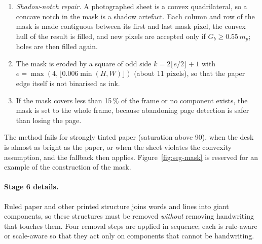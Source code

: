 \begin{enumerate}
\item \emph{Shadow-notch repair.} A photographed sheet is a convex quadrilateral, so a concave notch in the mask is a shadow artefact. Each column and row of the mask is made contiguous between its first and last mask pixel, the convex hull of the result is filled, and new pixels are accepted only if $G_b\ge0.55\,m_p$; holes are then filled again.
\item The mask is eroded by a square of odd side $k=2\lfloor e/2\rfloor+1$ with $e=\max(4,\lfloor0.006\min(H,W)\rfloor)$ (about 11 pixels), so that the paper edge itself is not binarised as ink.
\item If the mask covers less than 15\,\% of the frame or no component exists, the mask is set to the whole frame, because abandoning page detection is safer than losing the page.
\end{enumerate}
The method fails for strongly tinted paper (saturation above 90), when the desk is almost as bright as the paper, or when the sheet violates the convexity assumption, and the fallback then applies. Figure~\ref{fig:seg-mask} is reserved for an example of the construction of the mask.


\paragraph{Stage 6 details.}

Ruled paper and other printed structure joins words and lines into giant components, so these structures must be removed \emph{without} removing handwriting that touches them.
Four removal steps are applied in sequence; each is rule-aware or scale-aware so that they act only on components that cannot be handwriting.

